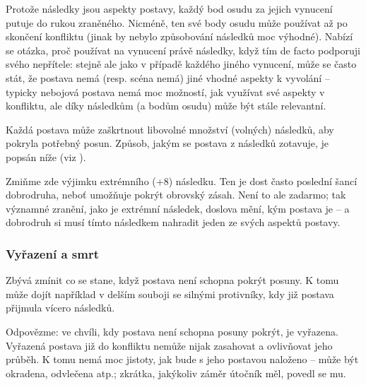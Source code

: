 \documentclass[../main.tex]{subfiles}
\begin{document}
Protože následky jsou aspekty postavy, každý bod osudu za jejich vynucení putuje do rukou
zraněného. Nicméně, ten své body osudu může používat až po skončení konfliktu (jinak by
nebylo způsobování následků moc výhodné). Nabízí se otázka, proč používat na vynucení
právě následky, když tím de facto podporuji svého nepřítele: stejně ale jako v případě
každého jiného vynucení, může se často stát, že postava nemá (resp. scéna nemá) jiné
vhodné aspekty k vyvolání – typicky nebojová postava nemá moc možností, jak využívat své
aspekty v konfliktu, ale díky následkům (a bodům osudu) může být stále relevantní.

Každá postava může zaškrtnout libovolné množství (volných) následků, aby pokryla potřebný
posun. Způsob, jakým se postava z následků zotavuje, je popsán níže (viz ).

Zmiňme zde výjimku extrémního (+8) následku. Ten je dost často poslední šancí dobrodruha,
neboť umožňuje pokrýt obrovský zásah. Není to ale zadarmo; tak významné zranění, jako je
extrémní následek, doslova mění, kým postava je – a dobrodruh si musí tímto následkem
nahradit jeden ze svých aspektů postavy.

\subsubsection{Vyřazení a smrt}
\label{sec:vyrazeniasmrt}

Zbývá zmínit co se stane, když postava není schopna pokrýt posuny. K tomu může dojít
například v delším souboji se silnými protivníky,
kdy již postava přijmula vícero následků.

Odpovězme: ve chvíli, kdy postava není schopna posuny pokrýt, je vyřazena. Vyřazená
postava již do konfliktu nemůže nijak zasahovat a ovlivňovat jeho průběh. K tomu nemá moc
jistoty, jak bude s jeho postavou naloženo – může být okradena, odvlečena atp.; zkrátka,
jakýkoliv záměr útočník měl, povedl se mu.
\end{document}
